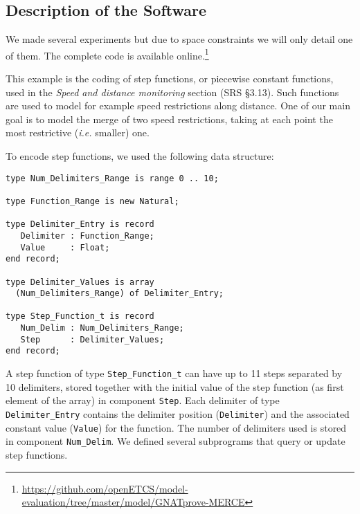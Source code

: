 \documentclass[10pt,a4paper,twocolumn]{article}
\newcommand{\ie}{\textit{i.e.}\xspace}
\newcommand{\SPARK}[1]{\lstinline[language=Ada,basicstyle={\footnotesize
      \sffamily},framesep=0pt]$#1$}
\begin{document}
\subsection{Description of the Software}

We made several experiments but due to space constraints we will only detail
one of them. The complete code is available
online.\footnote{\url{https://github.com/openETCS/model-evaluation/tree/master/model/GNATprove-MERCE}}

This example is the coding of step functions, or piecewise constant functions,
used in the \textit{Speed and distance monitoring} section (SRS §3.13). Such
functions are used to model for example speed restrictions along distance. One
of our main goal is to model the merge of two speed restrictions, taking at
each point the most restrictive (\ie smaller) one.

To encode step functions, we used the following data structure:
\begin{lstlisting}
type Num_Delimiters_Range is range 0 .. 10;

type Function_Range is new Natural;

type Delimiter_Entry is record
   Delimiter : Function_Range;
   Value     : Float;
end record;

type Delimiter_Values is array
  (Num_Delimiters_Range) of Delimiter_Entry;

type Step_Function_t is record
   Num_Delim : Num_Delimiters_Range;
   Step      : Delimiter_Values;
end record;
\end{lstlisting}

A step function of type \SPARK{Step_Function_t} can have up to 11 steps
separated by 10 delimiters, stored together with the initial value of the step
function (as first element of the array) in component \SPARK{Step}. Each
delimiter of type \SPARK{Delimiter_Entry} contains the delimiter position
(\SPARK{Delimiter}) and the associated constant value (\SPARK{Value}) for the
function. The number of delimiters used is stored in component
\SPARK{Num_Delim}.
We defined several subprograms that query or update step functions.
\end{document}
